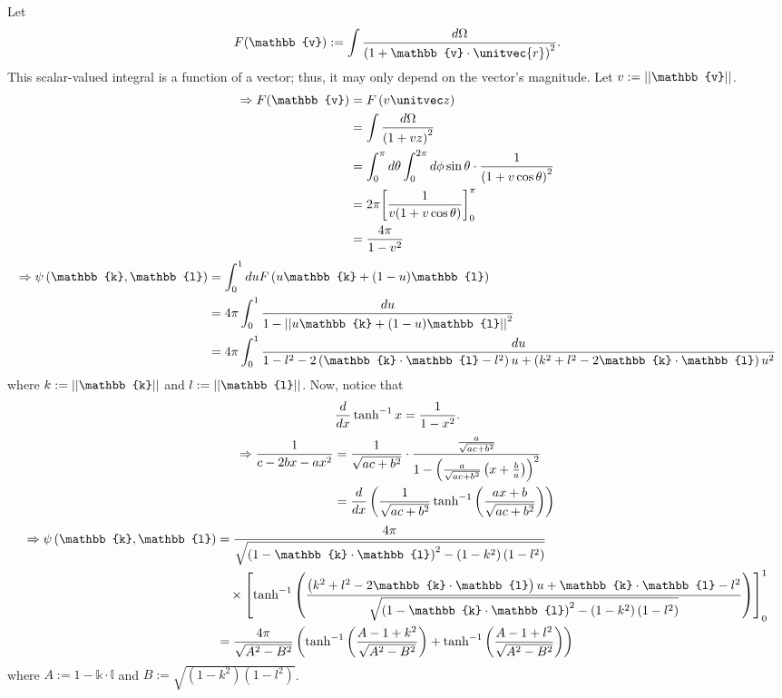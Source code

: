 Let
\[
    F(\mathbb{v}) := \int \frac{d\Omega}{{\left( 1 + \mathbb{v} \cdot \unitvec{r} \right)}^2}.
\]
This scalar-valued integral is a function of a vector;
thus, it may only depend on the vector's magnitude.
Let $v := \norm{\mathbb{v}}$.
\begin{align*}
    \Rightarrow F(\mathbb{v})
    &= F \left( v \zhat \right) \\
    &= \int \frac{d\Omega}{{\left( 1 + vz \right)}^2} \\
    &= \int_0^\pi d\theta \int_0^{2\pi} d\phi \sin \theta \cdot \inv{{\left( 1 + v\cos \theta \right)}^2} \\
    &= 2\pi \diffBetween{\inv{v(1 + v \cos \theta)}}{0}{\pi} \\
    &= \frac{4\pi}{1 - v^2}
\end{align*}
\begin{align*}
    \Rightarrow \psi \left(\mathbb{k}, \mathbb{l} \right)
    &= \int_0^1 du F\left( u\mathbb{k} + (1 - u)\mathbb{l} \right) \\
    &= 4\pi \int_0^1 \frac{du}{1 - \norm{u\mathbb{k} + (1 - u)\mathbb{l}}^2} \\
    &= 4\pi \int_0^1 \frac{du}{
        1 - l^2
        - 2\left( \mathbb{k}\cdot\mathbb{l} - l^2 \right) u
        + \left( k^2 + l^2 - 2\mathbb{k}\cdot\mathbb{l} \right) u^2
    }
\end{align*}
where $k := \norm{\mathbb{k}}$ and $l := \norm{\mathbb{l}}$.
Now, notice that
\[
    \frac{d}{dx} \tanh^{-1} x = \frac{1}{1 - x^2}.
\]
\begin{align*}
    \Rightarrow \frac{1}{c - 2bx - ax^2}
    &=  \frac{1}{\sqrt{ac + b^2}} \cdot \frac{\frac{a}{\sqrt{ac + b^2}}}{1 - {\left(
        \frac{a}{\sqrt{ac + b^2}} \left( x + \frac{b}{a} \right)
    \right)}^2} \\
    &= \frac{d}{dx} \left( \frac{1}{\sqrt{ac + b^2}} \tanh^{-1} \left( \frac{ax + b}{\sqrt{ac + b^2}} \right) \right)
\end{align*}
\begin{align*}
    \Rightarrow \psi \left(\mathbb{k}, \mathbb{l} \right)
    &= \frac{4\pi}{\sqrt{
        {\left( 1 - \mathbb{k}\cdot\mathbb{l} \right)}^2
        - \left( 1 - k^2 \right) \left( 1 - l^2 \right)
    }} \\
    &\quad \times \diffBetween{\tanh^{-1} \left(
        \frac{
            \left( k^2 + l^2 - 2\mathbb{k}\cdot\mathbb{l} \right) u 
            + \mathbb{k}\cdot\mathbb{l} - l^2
        }{\sqrt{
             {\left( 1 - \mathbb{k}\cdot\mathbb{l} \right)}^2
            - \left( 1 - k^2 \right) \left( 1 - l^2 \right)
        }}
    \right)}{0}{1} \\
    &= \frac{4\pi}{\sqrt{A^2 - B^2}} \left(
        \tanh^{-1} \left( \frac{A - 1 + k^2}{\sqrt{A^2 - B^2}} \right)
        + \tanh^{-1} \left( \frac{A - 1 + l^2}{\sqrt{A^2 - B^2}} \right)
    \right)
\end{align*}
where $A := 1 - \mathbb{k}\cdot\mathbb{l}$ and $B := \sqrt{\left( 1 - k^2 \right) \left( 1 - l^2 \right)}$.

